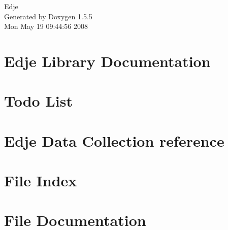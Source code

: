 \documentclass[a4paper]{book}
\begin{document}
\begin{titlepage}
\vspace*{7cm}
\begin{center}
{\Large Edje }\\
\vspace*{1cm}
{\large Generated by Doxygen 1.5.5}\\
\vspace*{0.5cm}
{\small Mon May 19 09:44:56 2008}\\
\end{center}
\end{titlepage}
\clearemptydoublepage
{}
\tableofcontents
\clearemptydoublepage
{}
\chapter{Edje Library Documentation }
\label{index}\hypertarget{index}{}
\chapter{Todo List}

\chapter{Edje Data Collection reference}

\chapter{File Index}

\chapter{File Documentation}


\printindex
\end{document}
